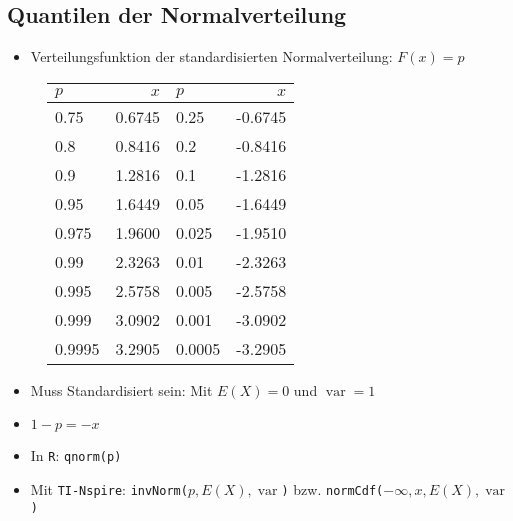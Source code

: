 \subsection{Quantilen der Normalverteilung}
\begin{itemize}
  \item Verteilungsfunktion der standardisierten Normalverteilung: $F(x) = p$
\end{itemize}
\begin{figure}[!h]
  \begin{center}
    \scriptsize
    \begin{tabular}{|l|r||l|r|}
      \hline
      $p$&$x$ & $p$ & $x$ \\
      \hline
      0.75&0.6745 & 0.25 & -0.6745 \\
      0.8&0.8416 & 0.2 & -0.8416 \\
      0.9&1.2816 & 0.1 & -1.2816 \\
      0.95&1.6449 & 0.05 & -1.6449 \\
      0.975&1.9600 & 0.025 & -1.9510 \\
      0.99&2.3263 & 0.01 & -2.3263 \\
      0.995&2.5758 & 0.005 & -2.5758 \\
      0.999&3.0902 & 0.001 & -3.0902 \\
      0.9995&3.2905 & 0.0005 & -3.2905 \\
      \hline
    \end{tabular}
  \end{center}
\end{figure}
\begin{itemize}
  \item Muss Standardisiert sein: Mit $E(X) = 0$ und $\operatorname{var} = 1$
  \item $1-p = -x$
  \item In \texttt{R}: \texttt{qnorm(p)}
  \item Mit \texttt{TI-Nspire}: \texttt{invNorm($p,E(X),\operatorname{var}$)} bzw. \texttt{normCdf($-\infty,x,E(X),\operatorname{var}$)}
\end{itemize}

\pagebreak

